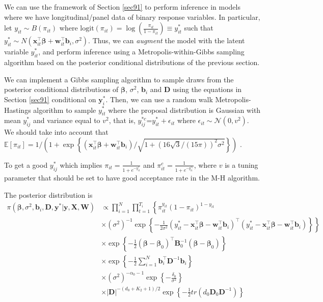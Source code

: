 We can use the framework of Section \ref{sec91} to perform inference in models where we have longitudinal/panel data of binary response variables. In particular, let $y_{it}\sim{B}(\pi_{it})$ where $\text{logit}(\pi_{it})=\log\left(\frac{\pi_{it}}{1-\pi_{it}}\right)\equiv y_{it}^*$ such that $y_{it}^*\sim N(\bm{x}_{it}^{\top}\bm{\beta}+\bm{w}_{it}^{\top}\bm{b}_i, \sigma^2)$. Thus, we can \textit{augment} the model with the latent variable $y_{it}^*$, and perform inference using a Metropolis-within-Gibbs sampling algorithm based on the posterior conditional distributions of the previous section. 

We can implement a Gibbs sampling algorithm to sample draws from the posterior conditional distributions of $\bm{\beta}$, $\sigma^2$, $\bm{b}_i$ and $\bm{D}$ using the equations in Section \ref{sec91} conditional on $\bm{y}_i^*$. Then, we can use a random walk Metropolis-Hastings algorithm to sample $y_{it}^*$ where the proposal distribution is Gaussian with mean $y_{ij}^*$ and variance equal to $v^2$, that is, $y_{ij}^{*c}$=$y_{it}^*+\epsilon_{it}$ where $\epsilon_{it}\sim\mathcal{N}(0,v^2)$. We should take into account that $\mathbb{E}[{\pi}_{it}]=1/(1+\exp\left\{(\bm{x}_{it}^{\top}\bm{\beta}+\bm{w}_{it}^{\top}\bm{b}_i)/\sqrt{1+(16\sqrt{3}/(15\pi))^2\sigma^2}\right\})$ \cite[~pag. 136]{diggle2002analysis}.


To get a good $y_{ij}^*$ which implies $\pi_{it}=\frac{1}{1+e^{-y_{it}^*}}$ and $\pi_{it}^c=\frac{1}{1+e^{-y_{it}^{*c}}}$, where $v$ is a tuning parameter that should be set to have good acceptance rate in the M-H algorithm.

The posterior distribution is
\begin{align*}
	\pi(\bm{\beta},\sigma^2, \bm{b}_i, \bm{D}, \bm{y}^*|\bm{y}, \bm{X}, \bm{W})&\propto \prod_{i=1}^N \prod_{t=1}^{T_i}\left\{\pi_{it}^{y_{it}}(1-\pi_{it})^{1-y_{it}}\right.\\
	&\left.\times (\sigma^2)^{-1}\exp\left\{-\frac{1}{2\sigma^2}(y_{it}^*-\bm{x}_{it}^{\top}\bm{\beta}-\bm{w}_{it}^{\top}\bm{b}_i)^{\top}(y_{it}^*-\bm{x}_{it}^{\top}\bm{\beta}-\bm{w}_{it}^{\top}\bm{b}_i)\right\}\right\}\\
	&\times \exp\left\{-\frac{1}{2}(\bm{\beta}-\bm{\beta}_0)^{\top}\bm{B}_0^{-1}(\bm{\beta}-\bm{\beta}_0)\right\}\\
	&\times \exp\left\{-\frac{1}{2}\sum_{i=1}^N \bm{b}_i^{\top}\bm{D}^{-1}\bm{b}_i\right\}\\
	&\times (\sigma^2)^{-\alpha_0-1}\exp\left\{-\frac{\delta_0}{\sigma^2}\right\}\\
	&\times |\bm{D}|^{-(d_0+K_2+1)/2}\exp\left\{-\frac{1}{2}tr(d_0\bm{D}_0\bm{D}^{-1})\right\}	
\end{align*}

